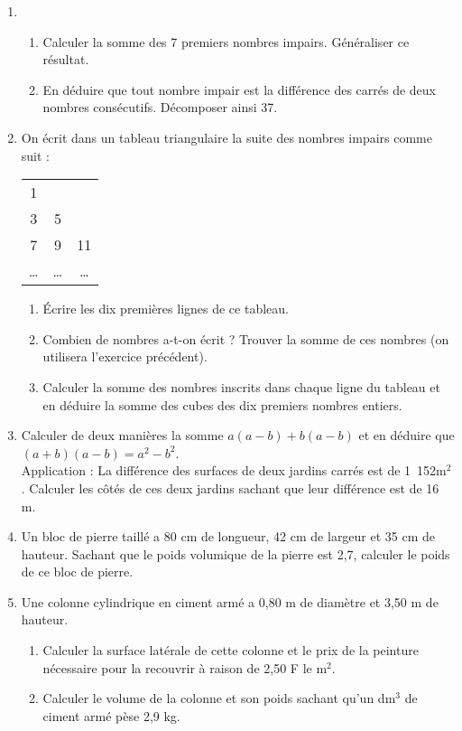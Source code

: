 \documentclass[12 pt]{report}
\theoremstyle{plain}
\newcounter{n}
\begin{document}
\begin{enumerate}
\begin{enumerate}
\end{enumerate}
\item \begin{enumerate}
\item Calculer la somme des 7 premiers nombres impairs.
Généraliser ce résultat. 
\item En déduire que tout nombre impair est la 
différence des carrés de deux nombres consécutifs.
Décomposer ainsi 37.
\end{enumerate}
\item On écrit dans un tableau triangulaire la suite des nombres impairs comme suit : 
 \begin{tabular}{ccc}
1 & & \\
3 & 5 & \\
7 & 9 & 11  \\
\ldots & \ldots & \ldots
\end{tabular}
\begin{enumerate}
\item Écrire les dix premières lignes de ce tableau.
\item Combien de nombres a-t-on écrit ? Trouver la 
somme de ces nombres (on utilisera l'exercice précédent). 
\item Calculer la somme des nombres inscrits dans 
chaque ligne du tableau et en déduire la somme des 
cubes des dix premiers nombres entiers.
\end{enumerate}
\item Calculer de deux manières la somme 
$a(a - b) + b(a - b)$ et en déduire que $(a + b)(a 
- b) = a^2 - b^2$. \\
Application : La différence des surfaces de deux 
jardins carrés est de 1~152m${}^2$. Calculer les côtés de 
ces deux jardins sachant que leur différence 
est de 16 m. 
\item Un bloc de pierre taillé a 80 cm de longueur,
42 cm de largeur et 35 cm de hauteur. Sachant que 
le poids volumique de la pierre est 2,7, calculer 
le poids de ce bloc de pierre. 
\item Une colonne cylindrique en ciment armé a 0,80 m 
de diamètre et 3,50 m de hauteur. \begin{enumerate}
\item Calculer la surface latérale de cette colonne 
et le prix de la peinture nécessaire pour la recouvrir 
à raison de 2,50 F le m${}^2$. 
\item Calculer le volume de la colonne et son poids 
sachant qu'un dm${}^3$ de ciment armé pèse 2,9 kg. 
\end{enumerate}

\end{enumerate}
\end{document}
